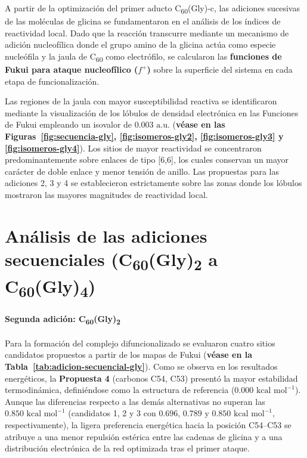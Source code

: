 A partir de la optimización del primer aducto C\textsubscript{60}(Gly)-c, las adiciones sucesivas de las moléculas de glicina se fundamentaron en el análisis de los índices de reactividad local. Dado que la reacción transcurre mediante un mecanismo de adición nucleofílica donde el grupo amino de la glicina actúa como especie nucleófila y la jaula de C\textsubscript{60} como electrófilo, se calcularon las \textbf{funciones de Fukui para ataque nucleofílico ($f^+$)} sobre la superficie del sistema en cada etapa de funcionalización.

Las regiones de la jaula con mayor susceptibilidad reactiva se identificaron mediante la visualización de los lóbulos de densidad electrónica en las Funciones de Fukui empleando un isovalor de $0.003\text{ a.u.}$ (\textbf{véase en las Figuras~\ref{fig:secuencia-gly}, \ref{fig:isomeros-gly2}, \ref{fig:isomeros-gly3} y \ref{fig:isomeros-gly4}}). Los sitios de mayor reactividad se concentraron predominantemente sobre enlaces de tipo [6,6], los cuales conservan un mayor carácter de doble enlace y menor tensión de anillo. Las propuestas para las adiciones 2, 3 y 4 se establecieron estrictamente sobre las zonas donde los lóbulos mostraron las mayores magnitudes de reactividad local.

\section{Análisis de las adiciones secuenciales (C\textsubscript{60}(Gly)\textsubscript{2} a C\textsubscript{60}(Gly)\textsubscript{4})}

\paragraph{Segunda adición: C\textsubscript{60}(Gly)\textsubscript{2}}
Para la formación del complejo difuncionalizado se evaluaron cuatro sitios candidatos propuestos a partir de los mapas de Fukui (\textbf{véase en la Tabla~\ref{tab:adicion-secuencial-gly}}). Como se observa en los resultados energéticos, la \textbf{Propuesta 4} (carbonos C54, C53) presentó la mayor estabilidad termodinámica, definiéndose como la estructura de referencia ($0.000\text{ kcal mol}^{-1}$). Aunque las diferencias respecto a las demás alternativas no superan las $0.850\text{ kcal mol}^{-1}$ (candidatos 1, 2 y 3 con $0.696$, $0.789$ y $0.850\text{ kcal mol}^{-1}$, respectivamente), la ligera preferencia energética hacia la posición C54--C53 se atribuye a una menor repulsión estérica entre las cadenas de glicina y a una distribución electrónica de la red optimizada tras el primer ataque.

